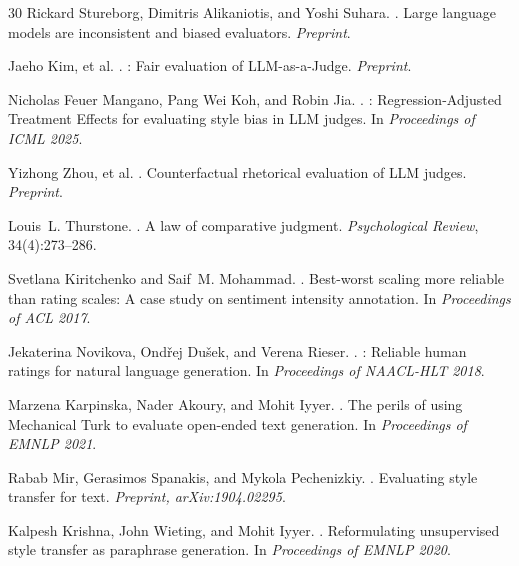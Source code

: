 \documentclass[11pt,a4paper]{article}
\begin{document}
\begin{thebibliography}{30}
Rickard Stureborg, Dimitris Alikaniotis, and Yoshi Suhara.
.
\newblock Large language models are inconsistent and biased evaluators.
\newblock \emph{Preprint}.

Jaeho Kim, et al.
.
: Fair evaluation of {LLM}-as-a-Judge.
\newblock \emph{Preprint}.

Nicholas Feuer Mangano, Pang Wei Koh, and Robin Jia.
.
: Regression-Adjusted Treatment Effects for evaluating style bias in {LLM} judges.
\newblock In \emph{Proceedings of ICML 2025}.

Yizhong Zhou, et al.
.
\newblock Counterfactual rhetorical evaluation of {LLM} judges.
\newblock \emph{Preprint}.

Louis~L. Thurstone.
.
\newblock A law of comparative judgment.
\newblock \emph{Psychological Review}, 34(4):273--286.

Svetlana Kiritchenko and Saif~M. Mohammad.
.
\newblock Best-worst scaling more reliable than rating scales: A case study on sentiment intensity annotation.
\newblock In \emph{Proceedings of ACL 2017}.

Jekaterina Novikova, Ond\v{r}ej Du\v{s}ek, and Verena Rieser.
.
: Reliable human ratings for natural language generation.
\newblock In \emph{Proceedings of NAACL-HLT 2018}.

Marzena Karpinska, Nader Akoury, and Mohit Iyyer.
.
\newblock The perils of using {Mechanical Turk} to evaluate open-ended text generation.
\newblock In \emph{Proceedings of EMNLP 2021}.

Rabab Mir, Gerasimos Spanakis, and Mykola Pechenizkiy.
.
\newblock Evaluating style transfer for text.
\newblock \emph{Preprint, arXiv:1904.02295}.

Kalpesh Krishna, John Wieting, and Mohit Iyyer.
.
\newblock Reformulating unsupervised style transfer as paraphrase generation.
\newblock In \emph{Proceedings of EMNLP 2020}.


\end{thebibliography}
\end{document}
